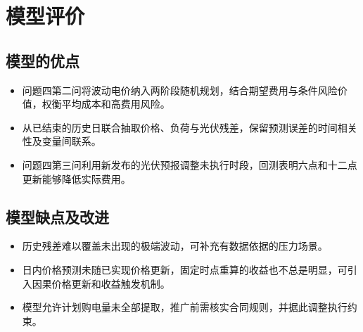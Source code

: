 \section{模型评价}

\subsection{模型的优点}
\begin{itemize}[label=$\checkmark$]
  \item 问题四第二问将波动电价纳入两阶段随机规划，结合期望费用与条件风险价值，权衡平均成本和高费用风险。
  \item 从已结束的历史日联合抽取价格、负荷与光伏残差，保留预测误差的时间相关性及变量间联系。
  \item 问题四第三问利用新发布的光伏预报调整未执行时段，回测表明六点和十二点更新能够降低实际费用。
\end{itemize}

\subsection{模型缺点及改进}
\begin{itemize}[label=\textbullet]
  \item 历史残差难以覆盖未出现的极端波动，可补充有数据依据的压力场景。
  \item 日内价格预测未随已实现价格更新，固定时点重算的收益也不总是明显，可引入因果价格更新和收益触发机制。
  \item 模型允许计划购电量未全部提取，推广前需核实合同规则，并据此调整执行约束。
\end{itemize}
